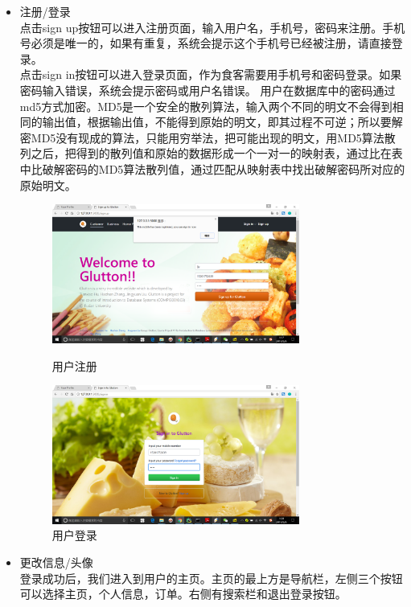 \documentclass[12pt, oneside,a4paper]{article}
\begin{document}
  \begin{itemize}
  \item 注册/登录\\
  点击sign up按钮可以进入注册页面，输入用户名，手机号，密码来注册。手机号必须是唯一的，如果有重复，系统会提示这个手机号已经被注册，请直接登录。\\
  点击sign in按钮可以进入登录页面，作为食客需要用手机号和密码登录。如果密码输入错误，系统会提示密码或用户名错误。
  用户在数据库中的密码通过md5方式加密。MD5是一个安全的散列算法，输入两个不同的明文不会得到相同的输出值，根据输出值，不能得到原始的明文，即其过程不可逆；所以要解密MD5没有现成的算法，只能用穷举法，把可能出现的明文，用MD5算法散列之后，把得到的散列值和原始的数据形成一个一对一的映射表，通过比在表中比破解密码的MD5算法散列值，通过匹配从映射表中找出破解密码所对应的原始明文。
  \begin{figure}[H]
   \begin{minipage}[t]{0.5\linewidth}
    \centering
     \includegraphics[width=3.2in]{cu-signup.jpg}
     \caption{\small{用户注册}}
   \end{minipage}
   \begin{minipage}[t]{0.5\linewidth}
    \centering
     \includegraphics[width=3.2in]{cu-signin.jpg}
      \caption{\small{用户登录}}
   \end{minipage}
   \end{figure}
  \item 更改信息/头像\\
  登录成功后，我们进入到用户的主页。主页的最上方是导航栏，左侧三个按钮可以选择主页，个人信息，订单。右侧有搜索栏和退出登录按钮。\\

\end{itemize}
\end{document}
